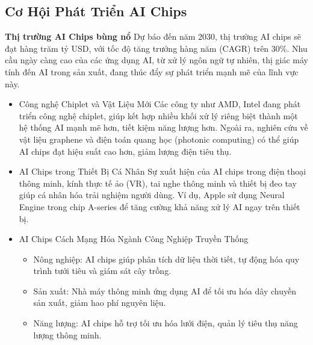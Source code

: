 \documentclass[a4paper]{article}
\begin{document}
\subsection{Cơ Hội Phát Triển AI Chips}
\textbf{Thị trường AI Chips bùng nổ}
Dự báo đến năm 2030, thị trường AI chips sẽ đạt hàng trăm tỷ USD, với tốc độ tăng trưởng hàng năm (CAGR) trên 30\%. Nhu cầu ngày càng cao của các ứng dụng AI, từ xử lý ngôn ngữ tự nhiên, thị giác máy tính đến AI trong sản xuất, đang thúc đẩy sự phát triển mạnh mẽ của lĩnh vực này.
\begin{itemize}
    \item Công nghệ Chiplet và Vật Liệu Mới
    Các công ty như AMD, Intel đang phát triển công nghệ chiplet, giúp kết hợp nhiều khối xử lý riêng biệt thành một hệ thống AI mạnh mẽ hơn, tiết kiệm năng lượng hơn. Ngoài ra, nghiên cứu về vật liệu graphene và điện toán quang học (photonic computing) có thể giúp AI chips đạt hiệu suất cao hơn, giảm lượng điện tiêu thụ.
    \item AI Chips trong Thiết Bị Cá Nhân
    Sự xuất hiện của AI chips trong điện thoại thông minh, kính thực tế ảo (VR), tai nghe thông minh và thiết bị đeo tay giúp cá nhân hóa trải nghiệm người dùng. Ví dụ, Apple sử dụng Neural Engine trong chip A-series để tăng cường khả năng xử lý AI ngay trên thiết bị.
    \item AI Chips Cách Mạng Hóa Ngành Công Nghiệp Truyền Thống
    \begin{itemize}
        \item Nông nghiệp: AI chips giúp phân tích dữ liệu thời tiết, tự động hóa quy trình tưới tiêu và giám sát cây trồng.
        \item Sản xuất: Nhà máy thông minh ứng dụng AI để tối ưu hóa dây chuyền sản xuất, giảm hao phí nguyên liệu.
        \item Năng lượng: AI chips hỗ trợ tối ưu hóa lưới điện, quản lý tiêu thụ năng lượng thông minh.
    \end{itemize}	

\end{itemize}
\end{document}
